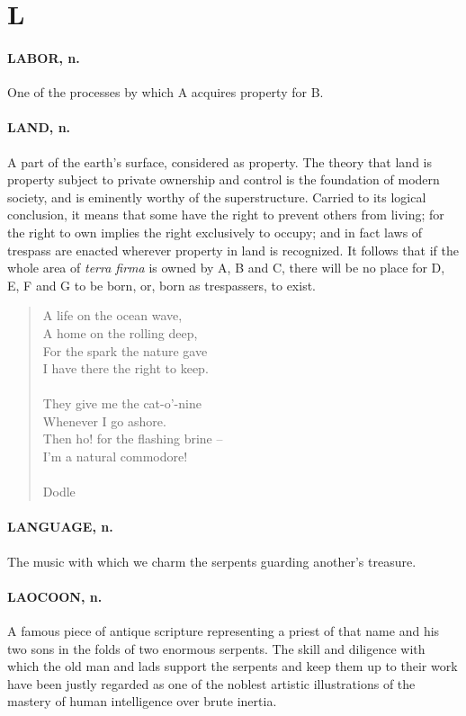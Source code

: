\documentclass[11pt]{article}
\begin{document}
\section*{L}



\paragraph{LABOR, n.}  One of the processes by which A acquires property for B.

\paragraph{LAND, n.}  A part of the earth's surface, considered as property.  The
theory that land is property subject to private ownership and control
is the foundation of modern society, and is eminently worthy of the
superstructure.  Carried to its logical conclusion, it means that some
have the right to prevent others from living; for the right to own
implies the right exclusively to occupy; and in fact laws of trespass
are enacted wherever property in land is recognized.  It follows that
if the whole area of {\em terra firma} is owned by A, B and C, there will
be no place for D, E, F and G to be born, or, born as trespassers, to
exist.

\begin{quote}   A life on the ocean wave, \\
      A home on the rolling deep, \\
  For the spark the nature gave \\
      I have there the right to keep. \\
 \\
  They give me the cat-o'-nine \\
      Whenever I go ashore. \\
  Then ho! for the flashing brine -- \\
      I'm a natural commodore! \\
 \\
Dodle \end{quote}


\paragraph{LANGUAGE, n.}  The music with which we charm the serpents guarding
another's treasure.

\paragraph{LAOCOON, n.}  A famous piece of antique scripture representing a priest
of that name and his two sons in the folds of two enormous serpents.
The skill and diligence with which the old man and lads support the
serpents and keep them up to their work have been justly regarded as
one of the noblest artistic illustrations of the mastery of human
intelligence over brute inertia.
\end{document}
